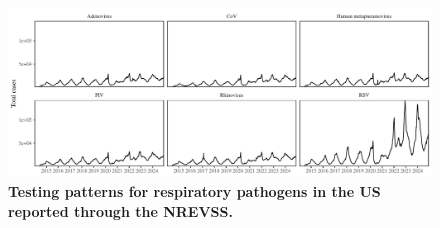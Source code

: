 \documentclass[12pt]{article}
\begin{document}
\pagebreak

\begin{figure}[!th]
\begin{center}
\includegraphics[width=\textwidth]{../figure_test/figure_test_nrevss.pdf}
\caption{
\textbf{Testing patterns for respiratory pathogens in the US reported through the NREVSS.}
}
\end{center}
\end{figure}

\pagebreak


\end{document}
